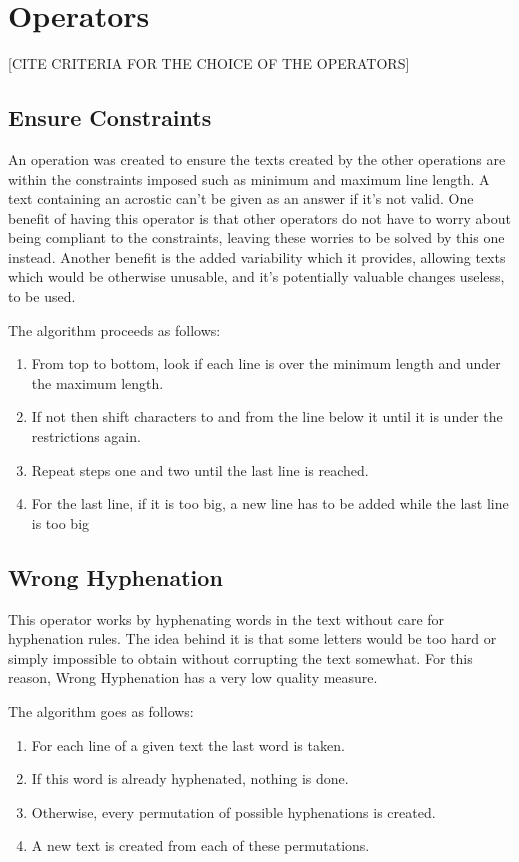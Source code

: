 \documentclass[11pt]{reportAlternative}
\begin{document}
\section{Operators}
[CITE CRITERIA FOR THE CHOICE OF THE OPERATORS]

\subsection{Ensure Constraints}
An operation was created to ensure the texts created by the other operations are within the constraints imposed such as minimum and maximum line length. A text containing an acrostic can't be given as an answer if it's not valid. One benefit of having this operator is that other operators do not have to worry about being compliant to the constraints, leaving these worries to be solved by this one instead. Another benefit is the added variability which it provides, allowing texts which would be otherwise unusable, and it's potentially valuable changes useless, to be used.

The algorithm proceeds as follows:
\begin{enumerate}
\item From top to bottom, look if each line is over the minimum length and under the maximum length.
\item If not then shift characters to and from the line below it until it is under the restrictions again.
\item Repeat steps one and two until the last line is reached.
\item For the last line, if it is too big, a new line has to be added while the last line is too big
\end{enumerate}

\subsection{Wrong Hyphenation}
This operator works by hyphenating words in the text without care for hyphenation rules. The idea behind it is that some letters would be too hard or simply impossible to obtain without corrupting the text somewhat.
For this reason, Wrong Hyphenation has a very low quality measure.

The algorithm goes as follows:
\begin{enumerate}
\item For each line of a given text the last word is taken.
\item If this word is already hyphenated, nothing is done.
\item Otherwise, every permutation of possible hyphenations is created.
\item A new text is created from each of these permutations.
\end{enumerate}
\end{document}
